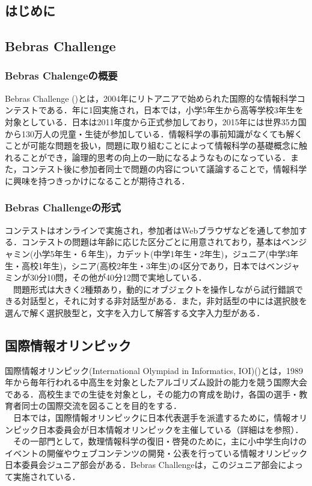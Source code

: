 \documentclass[a4paper]{jarticle}
\begin{document}
\maketitle
\begin{multicols}{2}
\setcounter{page}{1}

\section{はじめに}

\subsection{Bebras Challenge}
\subsubsection{Bebras Chalengeの概要}
Bebras Challenge (\cite{bebras-contest, bebras-pdf})とは，2004年にリトアニアで始められた国際的な情報科学コンテストである．年に1回実施され，日本では，小学5年生から高等学校3年生を対象としている．日本は2011年度から正式参加しており，2015年には世界35カ国から130万人の児童・生徒が参加している．情報科学の事前知識がなくても解くことが可能な問題を扱い，問題に取り組むことによって情報科学の基礎概念に触れることができ，論理的思考の向上の一助になるようなものになっている．また，コンテスト後に参加者同士で問題の内容について議論することで，情報科学に興味を持つきっかけになることが期待される．

\subsubsection{Bebras Challengeの形式}
 コンテストはオンラインで実施され，参加者はWebブラウザなどを通して参加する．コンテストの問題は年齢に応じた区分ごとに用意されており，基本はベンジャミン(小学5年生・６年生)，カデット(中学1年生・2年生)，ジュニア(中学3年生・高校1年生)，シニア(高校2年生・3年生)の4区分であり，日本ではベンジャミンが30分10問，その他が40分12問で実地している．
\\　問題形式は大きく2種類あり，動的にオブジェクトを操作しながら試行錯誤できる対話型と，それに対する非対話型がある．また，非対話型の中には選択肢を選んで解く選択肢型と，文字を入力して解答する文字入力型がある．

\subsection{国際情報オリンピック}
国際情報オリンピック(International Olympiad in Informatics, IOI)(\cite{ioi})とは，1989年から毎年行われる中高生を対象としたアルゴリズム設計の能力を競う国際大会である．高校生までの生徒を対象とし，その能力の育成を助け，各国の選手・教育者同士の国際交流を図ることを目的をする．
\\　日本では，国際情報オリンピックに日本代表選手を派遣するために，情報オリンピック日本委員会が日本情報オリンピックを主催している（詳細は\cite{joi}を参照）．
\\　その一部門として，数理情報科学の復旧・啓発のために，主に小中学生向けのイベントの開催やウェブコンテンツの開発・公表を行っている情報オリンピック日本委員会ジュニア部会がある．Bebras Challengeは，このジュニア部会によって実施されている．



\end{multicols}
\end{document}
